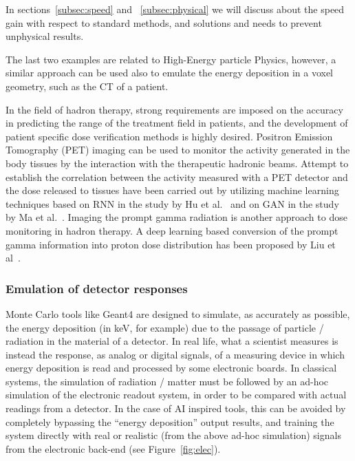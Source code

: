 In sections~\ref{subsec:speed} and ~\ref{subsec:physical} we will discuss about the speed gain with respect to standard methods, and solutions and needs to prevent unphysical results.

The last two examples are related to High-Energy particle Physics, however, a similar approach can be used also to emulate the energy deposition in a voxel geometry, such as the CT of a patient.

In the field of hadron therapy, strong requirements are imposed on the accuracy in predicting the range of the treatment field in patients, and the development of patient specific dose verification methods is highly desired. Positron Emission Tomography (PET) imaging can be used to monitor the activity generated in the body tissues by the interaction with the therapeutic hadronic beams. Attempt to establish the correlation between the activity measured with a PET detector and the dose released to tissues have been carried out by utilizing  machine learning techniques based on RNN in the study by Hu et al.~\cite{Hu2020} and on GAN in the study by Ma et al.~\cite{Ma2020c}. Imaging the prompt gamma radiation is another approach to dose monitoring in hadron therapy. A deep learning based conversion of the prompt gamma information into proton dose distribution has been proposed by Liu et al~. 


\subsubsection{Emulation of detector responses}
Monte Carlo tools like Geant4 are designed to simulate, as accurately as possible, the energy deposition (in keV, for example) due to the passage of particle / radiation in the material of a detector. In real life, what a scientist measures is instead the response, as analog or digital signals, of a measuring device in which energy deposition is read and processed by some electronic boards. In classical systems, the simulation of radiation / matter must be followed by an ad-hoc simulation of the electronic readout system, in order to be compared with actual readings from a detector. In the case of AI inspired tools, this can be avoided by completely bypassing the ``energy deposition'' output results, and training the system directly with real or realistic (from the above ad-hoc simulation) signals from the electronic back-end  (see Figure~\ref{fig:elec}).

